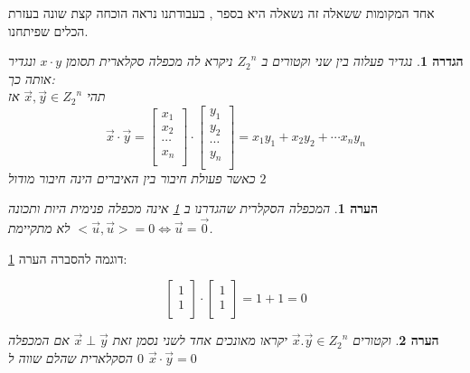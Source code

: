 \documentclass[12pt,twoside]{article}
\newtheorem{definition}{הגדרה}[section]
\newtheorem{comm}{הערה}[section]
\newcommand{\Zn}{{Z_2}^n}
\begin{document}
אחד המקומות ששאלה זה נשאלה היא בספר 
\cite{B3},
בעבודתנו נראה הוכחה קצת שונה בעזרת הכלים שפיתחנו.

\begin{definition}
    \label{def: inner mul}
    נגדיר פעלוה 
    בין שני וקטורים ב
    $\Zn$
    ניקרא לה מכפלה סקלארית
    תסומן 
    $x \cdot y$
    ונגדיר אותה כך:
    \\
    תהי 
    $\vec{x}, \vec{y} \in \Zn$
    אז 
    \[
        \vec{x} \cdot \vec{y} = 
        \begin{bmatrix}
            x_1 \\
            x_2 \\
            \cdots \\
            x_n \\
        \end{bmatrix}
        \cdot 
        \begin{bmatrix}
            y_1 \\
            y_2 \\
            \cdots \\
            y_n \\
        \end{bmatrix}
        = 
        x_1 y_1 + x_2 y_2 + \cdots x_n y_n
    \]
    כאשר 
    פעולת חיבור בין האיברים 
    הינה 
    חיבור מודול
    $2$
\end{definition}

\begin{comm}
    \label{comm: not really inner mul}
    המכפלה הסקלרית שהגדרנו ב
    \ref{def: inner mul}
    אינה מכפלה פנימית היות ותכונה 
    $<\vec{u},\vec{u}> = 0 \Leftrightarrow \vec{u} = \vec{0} $
    לא מתקיימת.
\end{comm}

דוגמה 
להסברה הערה
\ref{comm: not really inner mul}:

\[
    \begin{bmatrix}
    1 \\
    1 \\
    \end{bmatrix}    
    \cdot 
    \begin{bmatrix}
    1 \\
    1 \\
    \end{bmatrix} 
    = 1 + 1 = 0
\]

\begin{comm}
    וקטורים 
    $\vec{x}. \vec{y} \in \Zn $
    יקראו מאונכים אחד לשני נסמן זאת 
    $\vec{x} \perp  \vec{y}$
    אם המכפלה הסקלארית שהלם שווה 
    ל
    $0$
    $\vec{x} \cdot \vec{y} = 0$
\end{comm}
\end{document}
